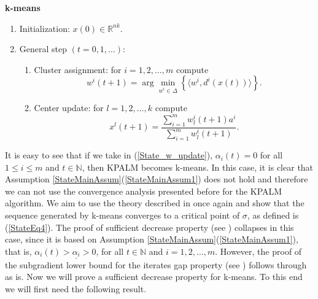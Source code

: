 \begin{framed}
\noindent \textbf{k-means}
\begin{enumerate}[(1)]
	\item Initialization: $x(0) \in \mathbb{R}^{nk}$.
	\item General step $\left( t=0,1, \ldots \right)$:
	\begin{enumerate}[(2.1)]
		\item Cluster assignment: for $i=1, 2, \ldots ,m$ compute
		\begin{equation}
			w^i(t+1) = \arg\!\min\limits_{w^i \in \Delta} \left\lbrace \langle w^i , d^i(x(t)) \rangle\right\rbrace . \label{StateEq12}
		\end{equation}
		\item Center update: for $l=1, 2, \ldots ,k$ compute
		\begin{equation}
			x^l(t+1) = \frac{\sum_{i=1}^{m} w^i_l(t+1) a^i}{\sum_{i=1}^{m} w^i_l(t+1)} . \label{StateEq13}
		\end{equation}
	\end{enumerate}
\end{enumerate}
\end{framed}

It is easy to see that if we take in (\ref{State_w_update}), $\alpha_i(t) = 0$ for all $1 \leq i \leq m$ and $t \in \mathbb{N}$, then KPALM becomes k-means. In this case, it is clear that Assumption \ref{StateMainAssum}(\ref{StateMainAssum1}) does not hold and therefore we can not use the convergence analysis presented before for the KPALM algorithm. We aim to use the theory described in  once again and show that the sequence generated by k-means converges to a critical point of $\sigma$, as defined is (\ref{StateEq4}). The proof of sufficient decrease property (see ) collapses in this case, since it is based on Assumption \ref{StateMainAssum}(\ref{StateMainAssum1}), that is, $\alpha_i(t) > \underline{\alpha_i} > 0$, for all $t \in \mathbb{N}$ and $i=1,2, \ldots, m$. However, the proof of the subgradient lower bound for the iterates gap property (see ) follows through as is. Now we will prove a sufficient decrease property for k-means. To this end we will first need the following result.

